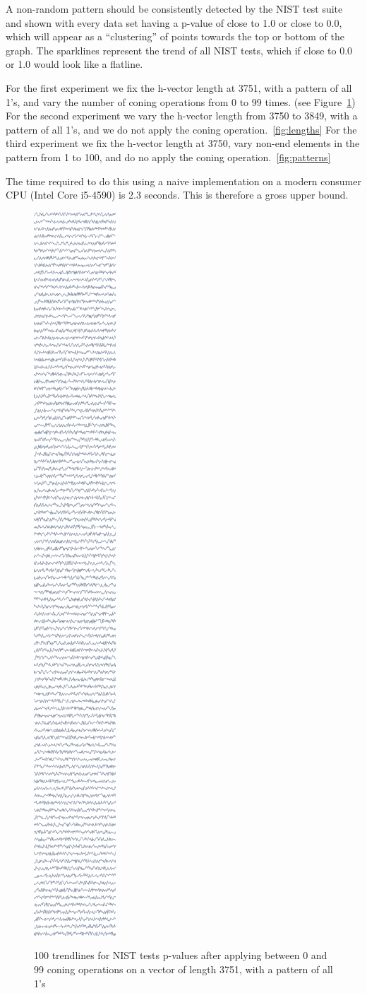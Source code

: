 \documentclass[oneside,12pt]{amsart}
\theoremstyle{definition}
\numberwithin{equation}{section}
\begin{document}
A non-random pattern should be consistently detected by the NIST test suite and shown with every data set having a p-value of close to 1.0 or close to 0.0, which will appear as a ``clustering'' of points towards the top or bottom of the graph. The sparklines represent the trend of all NIST tests, which if close to 0.0 or 1.0 would look like a flatline. 

For the first experiment we fix the h-vector length at 3751, with a pattern of all 1's, and vary the number of coning operations from 0 to 99 times. (see Figure~\ref{fig:conings})  %
For the second experiment we vary the h-vector length from 3750 to 3849, with a pattern of all 1's, and we do not apply the coning operation.~\ref{fig:lengths}   %
For the third experiment we fix the h-vector length at 3750, vary non-end elements in the pattern from 1 to 100, and do no apply the coning operation.~\ref{fig:patterns}  %

The time required to do this using a naive implementation on a modern consumer CPU (Intel Core i5-4590) is 2.3 seconds. This is therefore a gross upper bound.


\begin{figure}[h!]
\centering
\caption{100 trendlines for NIST tests p-values after applying between 0 and 99 coning operations on a vector of length 3751, with a pattern of all 1's} 
\includegraphics[width=0.8\linewidth, height=0.5\linewidth]{./charts/varying-conings-v2.png}
\label{fig:conings}
\end{figure}
\end{document}
